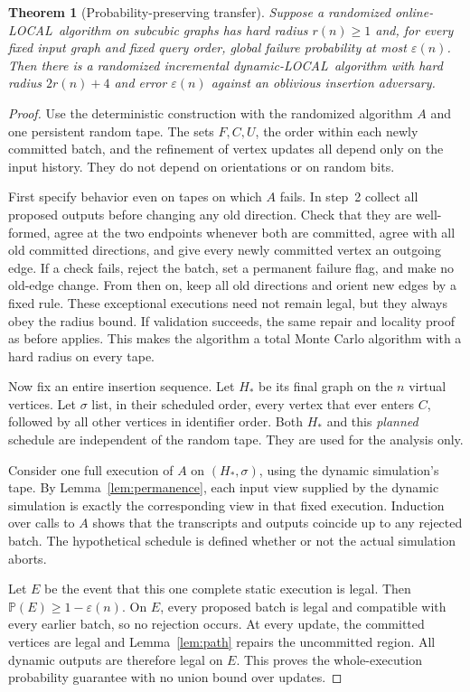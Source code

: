 \documentclass[11pt]{article}
\newtheorem{theorem}{Theorem}[section]
\theoremstyle{definition}
\newcommand{\Dyn}{\textnormal{dynamic-LOCAL}}
\newcommand{\On}{\textnormal{online-LOCAL}}
\newcommand{\Prb}{\mathbb P}
\begin{document}
\begin{theorem}[Probability-preserving transfer]\label{thm:random-transfer}
Suppose a randomized \On\ algorithm on subcubic graphs has hard radius
$r(n)\ge1$ and, for every fixed input graph and fixed query order, global
failure probability at most $\varepsilon(n)$. Then there is a randomized
incremental \Dyn\ algorithm with hard radius $2r(n)+4$ and error
$\varepsilon(n)$ against an oblivious insertion adversary.
\end{theorem}
\begin{proof}
Use the deterministic construction with the randomized algorithm $A$ and
one persistent random tape. The sets $F,C,U$, the order within each newly
committed batch, and the refinement of vertex updates all depend only on
the input history. They do not depend on orientations or on random bits.

First specify behavior even on tapes on which $A$ fails. In step~2 collect
all proposed outputs before changing any old direction. Check that they are
well-formed, agree at the two endpoints whenever both are committed, agree
with all old committed directions, and give every newly committed vertex
an outgoing edge. If a check fails, reject the batch, set a permanent failure
flag, and make no old-edge change. From then on, keep all old directions
and orient new edges by a fixed rule. These exceptional executions need not
remain legal, but they always obey the radius bound. If validation succeeds,
the same repair and locality proof as before applies. This makes the
algorithm a total Monte Carlo algorithm with a hard radius on every tape.

Now fix an entire insertion sequence. Let $H_*$ be its final graph on the
$n$ virtual vertices. Let $\sigma$ list, in their scheduled order, every
vertex that ever enters $C$, followed by all other vertices in identifier
order. Both $H_*$ and this \emph{planned} schedule are independent of the
random tape. They are used for the analysis only.

Consider one full execution of $A$ on $(H_*,\sigma)$, using the dynamic
simulation's tape. By Lemma~\ref{lem:permanence}, each input view supplied
by the dynamic simulation is exactly the corresponding view in that fixed
execution. Induction over calls to $A$ shows that the transcripts and
outputs coincide up to any rejected batch. The hypothetical schedule is
defined whether or not the actual simulation aborts.

Let $E$ be the event that this one complete static execution is legal.
Then $\Prb(E)\ge1-\varepsilon(n)$. On $E$, every proposed batch is legal
and compatible with every earlier batch, so no rejection occurs. At every
update, the committed vertices are legal and Lemma~\ref{lem:path} repairs
the uncommitted region. All dynamic outputs are therefore legal on $E$.
This proves the whole-execution probability guarantee with no union bound
over updates.
\end{proof}
\end{document}

